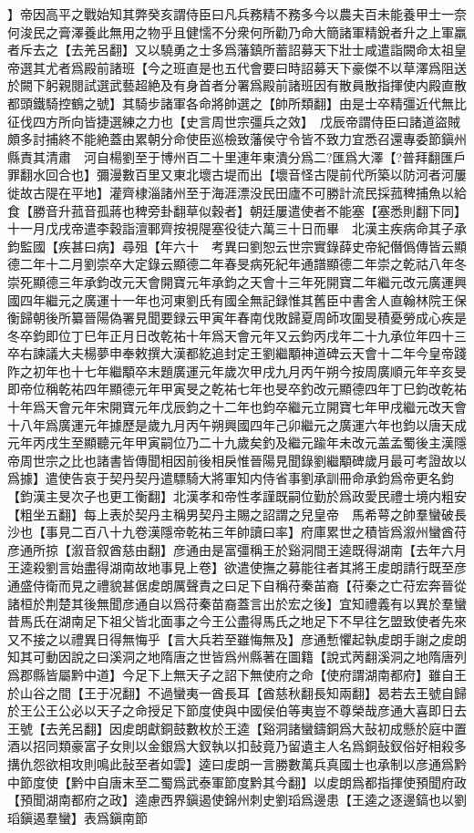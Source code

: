 】帝因高平之戰始知其弊癸亥謂侍臣曰凡兵務精不務多今以農夫百未能養甲士一奈何浚民之膏澤養此無用之物乎且健懦不分衆何所勸乃命大簡諸軍精銳者升之上軍羸者斥去之【去羌呂翻】又以驍勇之士多爲藩鎮所蓄詔募天下壯士咸遣詣闕命太祖皇帝選其尤者爲殿前諸班【今之班直是也五代會要曰時詔募天下豪傑不以草澤爲阻送於闕下躬親閱試選武藝超絶及有身首者分署爲殿前諸班因有散員散指揮使内殿直散都頭鐵騎控鶴之號】其騎步諸軍各命將帥選之【帥所類翻】由是士卒精彊近代無比征伐四方所向皆捷選練之力也【史言周世宗彊兵之效】　戊辰帝謂侍臣曰諸道盜賊頗多討捕終不能絶蓋由累朝分命使臣巡檢致藩侯守令皆不致力宜悉召還專委節鎭州縣責其清肅　河自楊劉至于博州百二十里連年東潰分爲二?匯爲大澤【?普拜翻匯戶罪翻水回合也】彌漫數百里又東北壞古堤而出【壞音怪古隄前代所築以防河者河屢徙故古隄在平地】灌齊棣淄諸州至于海涯漂没民田廬不可勝計流民採菰稗捕魚以給食【勝音升菰音孤蔣也稗旁卦翻草似穀者】朝廷屢遣使者不能塞【塞悉則翻下同】十一月戊戌帝遣李穀詣澶鄆齊按視隄塞役徒六萬三十日而畢　北漢主疾病命其子承鈞監國【疾甚曰病】尋殂【年六十　考異曰劉恕云世宗實錄薛史帝紀僭僞傳皆云顯德二年十二月劉崇卒大定錄云顯德二年春旻病死紀年通譜顯德二年崇之乾祜八年冬崇死顯德三年承鈞改元天會開寶元年承鈞之天會十三年死開寶二年繼元改元廣運興國四年繼元之廣運十一年也河東劉氏有國全無記録惟其舊臣中書舍人直翰林院王保衡歸朝後所纂晉陽偽署見聞要録云甲寅年春南伐敗歸夏周師攻圍旻積憂勞成心疾是冬卒鈞即位丁巳年正月日改乾祐十年爲天會元年又云鈞丙戌年二十九承位年四十三卒右諫議大夫楊夢申奉敕撰大漢都紇追封定王劉繼顒神道碑云天會十二年今皇帝踐阼之初年也十七年繼顒卒末題廣運元年歲次甲戌九月丙午朔今按周廣順元年辛亥旻即帝位稱乾祐四年顯德元年甲寅旻之乾祐七年也旻卒釣改元顯德四年丁巳鈞改乾祐十年爲天會元年宋開寶元年戊辰鈞之十二年也鈞卒繼元立開寶七年甲戌繼元改天會十八年爲廣運元年據歷是歲九月丙午朔興國四年己卯繼元之廣運六年也鈞以唐天成元年丙戌生至顯聽元年甲寅嗣位乃二十九歲矣釣及繼元踰年未改元盖孟蜀後主漢隱帝周世宗之比也諸書皆傳聞相因前後相戾惟晉陽見聞錄劉繼顒碑歲月最可考證故以爲據】遣使告哀于契丹契丹遣驃騎大將軍知内侍省事劉承訓冊命承鈞爲帝更名鈞【鈞漢主旻次子也更工衡翻】北漢孝和帝性孝謹既嗣位勤於爲政愛民禮士境内粗安【粗坐五翻】每上表於契丹主稱男契丹主賜之詔謂之兒皇帝　馬希萼之帥羣蠻破長沙也【事見二百八十九卷漢隱帝乾祐三年帥讀曰率】府庫累世之積皆爲溆州蠻酋苻彦通所掠【溆音叙酋慈由翻】彦通由是富彊稱王於谿洞間王逵既得湖南【去年六月王逵殺劉言始盡得湖南故地事見上卷】欲遣使撫之募能往者其將王䖍朗請行既至彦通盛侍衛而見之禮貌甚倨䖍朗厲聲責之曰足下自稱苻秦苖裔【苻秦之亡苻宏奔晉從諸桓於荆楚其後無聞彦通自以爲苻秦苗裔蓋言出於宏之後】宜知禮義有以異於羣蠻昔馬氏在湖南足下祖父皆北面事之今王公盡得馬氏之地足下不早往乞盟致使者先來又不接之以禮異日得無悔乎【言大兵若至雖悔無及】彦通慙懼起執䖍朗手謝之䖍朗知其可動因說之曰溪洞之地隋唐之世皆爲州縣著在圖籍【說式苪翻溪洞之地隋唐列爲郡縣皆屬黔中道】今足下上無天子之詔下無使府之命【使府謂湖南都府】雖自王於山谷之間【王于况翻】不過蠻夷一酋長耳【酋慈秋翻長知兩翻】曷若去王號自歸於王公王公必以天子之命授足下節度使與中國侯伯等夷豈不尊榮哉彦通大喜即日去王號【去羌呂翻】因䖍朗獻銅鼓數枚於王逵【谿洞諸蠻鑄銅爲大鼔初成懸於庭中置酒以招同類豪富子女則以金銀爲大釵執以扣鼔竟乃留遺主人名爲銅鼔釵俗好相殺多搆仇怨欲相攻則鳴此鼔至者如雲】逵曰䖍朗一言勝數萬兵真國士也承制以彦通爲黔中節度使【黔中自唐末至二蜀爲武泰軍節度黔其今翻】以䖍朗爲都指揮使預聞府政【預聞湖南都府之政】逵慮西界鎭遏使錦州刺史劉瑫爲邊患【王逵之逐邊鎬也以劉瑫鎭遏羣蠻】表爲鎭南節